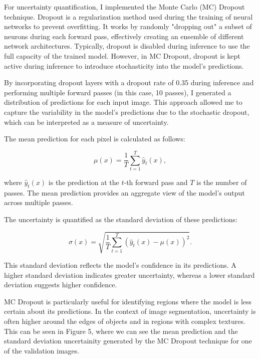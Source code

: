 \documentclass{article}
\begin{document}
For uncertainty quantification, I implemented the Monte Carlo (MC) Dropout technique. Dropout is a regularization method 
used during the training of neural networks to prevent overfitting. It works by randomly "dropping out" a subset of neurons 
during each forward pass, effectively creating an ensemble of different network architectures. Typically, dropout is 
disabled during inference to use the full capacity of the trained model. However, in MC Dropout, dropout is kept active 
during inference to introduce stochasticity into the model's predictions.

By incorporating dropout layers with a dropout rate of 0.35 during inference and performing multiple forward passes 
(in this case, 10 passes), I generated a distribution of predictions for each input image. This approach allowed me to 
capture the variability in the model's predictions due to the stochastic dropout, which can be interpreted as a measure of 
uncertainty.

The mean prediction for each pixel is calculated as follows:

\[
\mu(x) = \frac{1}{T} \sum_{t=1}^{T} \hat{y}_t(x),
\]

where \( \hat{y}_t(x) \) is the prediction at the \( t \)-th forward pass and \( T \) is the number of passes. The mean 
prediction provides an aggregate view of the model's output across multiple passes.

The uncertainty is quantified as the standard deviation of these predictions:

\[
\sigma(x) = \sqrt{\frac{1}{T} \sum_{t=1}^{T} (\hat{y}_t(x) - \mu(x))^2}.
\]

This standard deviation reflects the model's confidence in its predictions. A higher standard deviation indicates greater 
uncertainty, whereas a lower standard deviation suggests higher confidence. 

MC Dropout is particularly useful for identifying regions where the model is less certain about its predictions. In the 
context of image segmentation, uncertainty is often higher around the edges of objects and in regions with complex textures. 
This can be seen in Figure 5, where we can see the mean prediction and the standard deviation uncertainity generated by 
the MC Dropout technique for one of the validation images.
\end{document}
